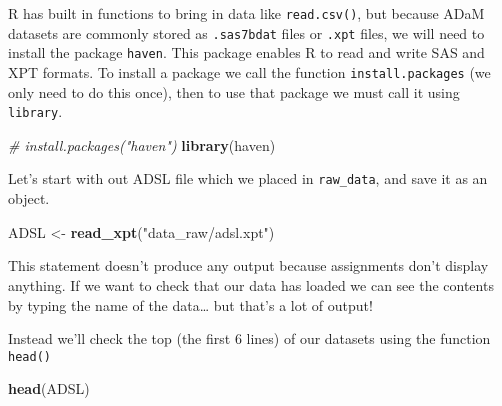 \documentclass[]{book}
\newenvironment{Shaded}{\begin{snugshade}}{\end{snugshade}}
\newcommand{\CommentTok}[1]{\textcolor[rgb]{0.56,0.35,0.01}{\textit{#1}}}
\newcommand{\KeywordTok}[1]{\textcolor[rgb]{0.13,0.29,0.53}{\textbf{#1}}}
\newcommand{\NormalTok}[1]{#1}
\newcommand{\StringTok}[1]{\textcolor[rgb]{0.31,0.60,0.02}{#1}}
\begin{document}
R has built in functions to bring in data like \texttt{read.csv()}, but because ADaM datasets are commonly stored as \texttt{.sas7bdat} files or \texttt{.xpt} files, we will need to install the package \texttt{haven}. This package enables R to read and write SAS and XPT formats. To install a package we call the function \texttt{install.packages} (we only need to do this once), then to use that package we must call it using \texttt{library}.

\begin{Shaded}
\begin{Highlighting}[]
\CommentTok{# install.packages("haven")}
\KeywordTok{library}\NormalTok{(haven)}
\end{Highlighting}
\end{Shaded}

Let's start with out ADSL file which we placed in \texttt{raw\_data}, and save it as an object.

\begin{Shaded}
\begin{Highlighting}[]
\NormalTok{ADSL <-}\StringTok{ }\KeywordTok{read_xpt}\NormalTok{(}\StringTok{"data_raw/adsl.xpt"}\NormalTok{)}
\end{Highlighting}
\end{Shaded}

This statement doesn't produce any output because assignments don't display anything. If we want to check that our data has loaded we can see the contents by typing the name of the data\ldots{} but that's a lot of output!

Instead we'll check the top (the first 6 lines) of our datasets using the function \texttt{head()}

\begin{Shaded}
\begin{Highlighting}[]
\KeywordTok{head}\NormalTok{(ADSL)}
\end{Highlighting}
\end{Shaded}
\end{document}
